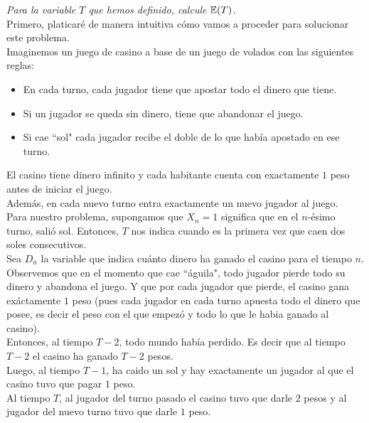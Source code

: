 \emph
{
	Para la variable $T$ que hemos definido, calcule $\mathbb{E}\! \left( T \right)$.\\
}
\afterstatement
	Primero, platicaré de manera intuitiva cómo vamos a proceder para solucionar este problema.\\

	Imaginemos un juego de casino a base de un juego de volados con las siguientes reglas:\\
	\begin{itemize}
			\item En cada turno, cada jugador tiene que apostar todo el dinero que tiene.
			\item Si un jugador se queda sin dinero, tiene que abandonar el juego.
			\item Si cae ``sol" cada jugador recibe el doble de lo que había apostado en ese turno.  
	\end{itemize}
   
	\;El casino tiene dinero infinito y cada habitante cuenta con exactamente $1$ peso antes de
	iniciar el juego.\\
   
	Además, en cada nuevo turno entra exactamente un nuevo jugador al juego.\\
   
	Para nuestro problema, supongamos que $X_n = 1$ significa que en el $n$-ésimo turno, salió sol.
	Entonces, $T$ nos indica cuando es la primera vez que caen dos soles consecutivos.\\
   
	Sea $D_n$ la variable que indica cuánto dinero ha ganado el casino para el tiempo $n$.\\
   
	Observemos que en el momento que cae ``águila", todo jugador pierde todo su dinero y abandona el juego.
	Y que por cada jugador que pierde, el casino gana exáctamente $1$ peso (pues cada jugador en cada
	turno apuesta todo el dinero que posee, es decir el peso con el que empezó y todo lo que le habia
	ganado al casino).\\
   
	Entonces, al tiempo $T-2$, todo mundo había perdido. Es decir que al tiempo $T-2$ el casino ha ganado
	$T-2$ pesos.\\
   
	Luego, al tiempo $T-1$, ha caido un sol y hay exactamente un jugador al que el casino tuvo 
	que pagar $1$ peso.\\
   
	Al tiempo $T$, al jugador del turno pasado el casino tuvo que darle $2$ pesos y al jugador del nuevo
	turno tuvo que darle $1$ peso.\\
   
